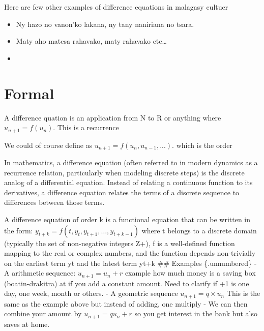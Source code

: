\documentclass[
  letterpaper,
  DIV=11,
  numbers=noendperiod]{scrreprt}
\providecommand{\tightlist}{%
  \setlength{\itemsep}{0pt}\setlength{\parskip}{0pt}}
\begin{document}
Here are few other examples of difference equations in malagasy cultuer

\begin{itemize}
\tightlist
\item
  Ny hazo no vanon'ko lakana, ny tany naniriana no tsara.
\item
  Maty aho matesa rahavako, maty rahavako etc\ldots{}
\item
\end{itemize}

\section*{Formal}\label{formal-12}


A difference quation is an application from N to R or anything where
\(u_{n+1} = f(u_n)\). This is a recurrence

We could of course define as \(u_{n+1} = f(u_n, u_{n-1},...)\). which is
the order

In mathematics, a difference equation (often referred to in modern
dynamics as a recurrence relation, particularly when modeling discrete
steps) is the discrete analog of a differential equation. Instead of
relating a continuous function to its derivatives, a difference equation
relates the terms of a discrete sequence to differences between those
terms.

A difference equation of order k is a functional equation that can be
written in the form: \(y_{t+k} = f(t, y_t, y_{t+1}, \dots, y_{t+k-1})\)
where t belongs to a discrete domain (typically the set of non-negative
integers Z+), f is a well-defined function mapping to the real or
complex numbers, and the function depends non-trivially on the earliest
term yt and the latest term yt+k \hspace{0pt} \#\# Examples
\{.unnumbered\} - A arithmetic sequence: \(u_{n+1} = u_n + r\) example
how much money is a saving box (boatin-drakitra) at if you add a
constant amount. Need to clarify if +1 is one day, one week, month or
others. - A geometric sequence \(u_{n+1} = q \times u_n\) This is the
same as the example above but instead of adding, one multiply - We can
then combine your amount by \(u_{n+1} = q u_n + r\) so you get interest
in the bank but also saves at home.
\end{document}
